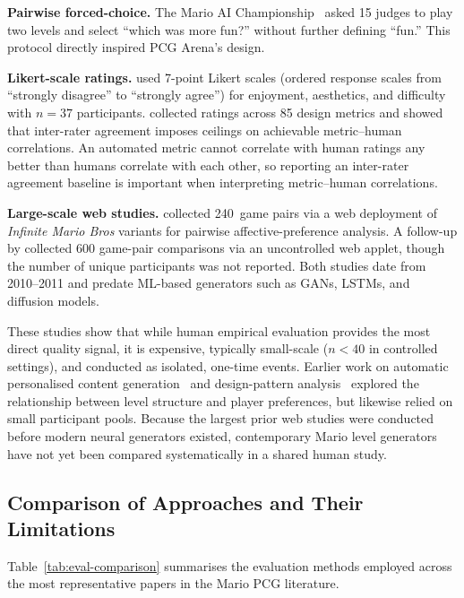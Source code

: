 \documentclass[shortabstract, mgr, english]{iithesis}
\begin{document}
\textbf{Pairwise forced-choice.} The Mario AI
Championship~\citep{shaker2011mario} asked 15 judges to play two levels and
select ``which was more fun?'' without further defining ``fun.'' This protocol
directly inspired PCG Arena's design.

\textbf{Likert-scale ratings.} \citet{marino2015empirical} used 7-point Likert
scales (ordered response scales from ``strongly disagree'' to ``strongly agree'')
for enjoyment, aesthetics, and difficulty with $n = 37$ participants. 
\citet{summerville2017understanding} collected ratings across 85 design metrics
and showed that inter-rater agreement imposes ceilings on achievable
metric--human correlations. An automated metric cannot correlate with human ratings any better
than humans correlate with each other, so reporting an inter-rater agreement
baseline is important when interpreting metric--human correlations.


\textbf{Large-scale web studies.} \citet{pedersen2010modeling} collected
240~game pairs via a web deployment of \emph{Infinite Mario Bros} variants
for pairwise affective-preference analysis.
A follow-up by \citet{shaker2011features} collected 600
game-pair comparisons via an uncontrolled web applet, though the number of unique
participants was not reported.
Both studies date from 2010--2011 and predate ML-based generators
such as GANs, LSTMs, and diffusion models.

These studies show that while human empirical evaluation provides the
most direct quality signal, it is expensive, typically small-scale ($n < 40$ in
controlled settings), and conducted as isolated, one-time events.
Earlier work on automatic personalised content
generation~\citep{shaker2010towards} and design-pattern
analysis~\citep{dahlskog2013patterns} explored the relationship between
level structure and player preferences, but likewise relied on small participant
pools.
Because the largest prior web studies were conducted before modern
neural generators existed, contemporary Mario level generators have not yet been compared systematically in a shared human study.

\subsection{Comparison of Approaches and Their Limitations}
\label{subsec:bg-eval-comparison}

Table~\ref{tab:eval-comparison} summarises the evaluation methods employed across
the most representative papers in the Mario PCG literature.
\end{document}
